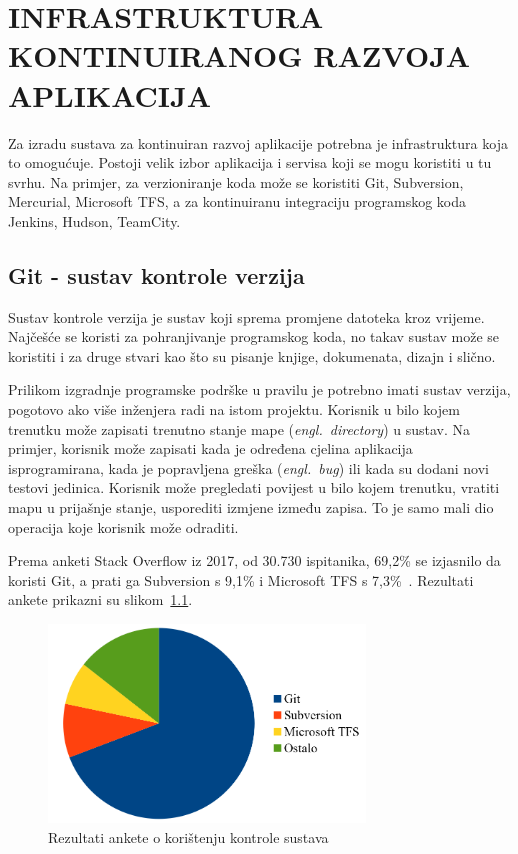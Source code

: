 \chapter{INFRASTRUKTURA KONTINUIRANOG RAZVOJA APLIKACIJA}
Za izradu sustava za kontinuiran razvoj aplikacije potrebna je infrastruktura koja to omogućuje.
Postoji velik izbor aplikacija i servisa koji se mogu koristiti u tu svrhu.  Na primjer, za
verzioniranje koda može se koristiti Git, Subversion, Mercurial, Microsoft TFS, a za kontinuiranu
integraciju programskog koda Jenkins, Hudson, TeamCity.


\section{Git - sustav kontrole verzija}
Sustav kontrole verzija je sustav koji sprema promjene datoteka kroz vrijeme. Najčešće se koristi za
pohranjivanje programskog koda, no takav sustav može se koristiti i za druge stvari kao što su
pisanje knjige, dokumenata, dizajn i slično.

Prilikom izgradnje programske podrške u pravilu je potrebno imati sustav verzija, pogotovo ako više
inženjera radi na istom projektu. Korisnik u bilo kojem trenutku može zapisati trenutno stanje mape
(\textit{engl.~directory}) u sustav. Na primjer, korisnik može zapisati kada je određena cjelina
aplikacija isprogramirana, kada je popravljena greška (\textit{engl.~bug}) ili kada su dodani novi
testovi jedinica. Korisnik može pregledati povijest u bilo kojem trenutku, vratiti mapu u prijašnje
stanje, usporediti izmjene između zapisa. To je samo mali dio operacija koje korisnik može odraditi.

Prema anketi Stack Overflow iz 2017, od 30.730 ispitanika, 69,2\% se izjasnilo da koristi
Git, a prati ga Subversion s 9,1\% i Microsoft TFS s 7,3\%~\citep{StackOverflow2017Survey}.
Rezultati ankete prikazni su slikom~\ref{fig:02so_survey}.

\begin{figure}[h]
    \centering
    \includegraphics[width=0.75\textwidth]{img/02/so_survey.png}
    \caption{Rezultati ankete o korištenju kontrole sustava}%
    \label{fig:02so_survey}
\end{figure}


